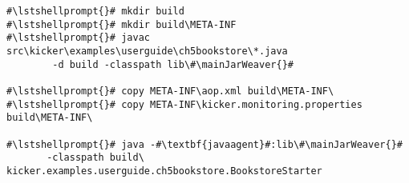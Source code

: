 \begin{lstlisting}[caption=Commands to compile and run the annotated Bookstore under Windows, label=lst:traceAnalysisCompileRunExample1Win]
#\lstshellprompt{}# mkdir build
#\lstshellprompt{}# mkdir build\META-INF
#\lstshellprompt{}# javac src\kicker\examples\userguide\ch5bookstore\*.java
        -d build -classpath lib\#\mainJarWeaver{}#

#\lstshellprompt{}# copy META-INF\aop.xml build\META-INF\
#\lstshellprompt{}# copy META-INF\kicker.monitoring.properties build\META-INF\

#\lstshellprompt{}# java -#\textbf{javaagent}#:lib\#\mainJarWeaver{}#
       -classpath build\ kicker.examples.userguide.ch5bookstore.BookstoreStarter
\end{lstlisting}
